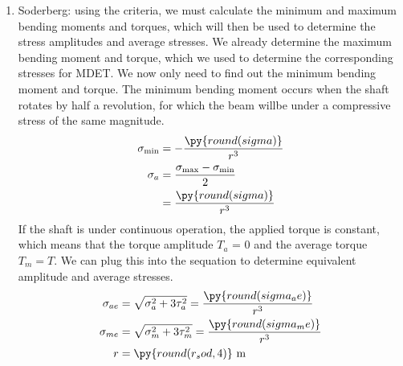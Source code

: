 \documentclass[
10pt,
a4paper,
openany,
svgnames,
]{book}
\begin{document}
\begin{solution}
\begin{enumerate}
    \item Soderberg: using the criteria, we must calculate the minimum and maximum bending moments and torques, which will then be used to determine the stress amplitudes and average stresses. We already determine the maximum bending moment and torque, which we used to determine the corresponding stresses for MDET. We now only need to find out the minimum bending moment and torque. The minimum bending moment occurs when the shaft rotates by half a revolution, for which the beam willbe under a compressive stress of the same magnitude.
      \begin{align*}
        \sigma_{\min} &= -\frac{\py{round(sigma)}}{r^{3}} \\
        \sigma_{a} &= \frac{\sigma_{\max} - \sigma_{\min}}{2} \\
                      &= \frac{\py{round(sigma)}}{r^{3}}
      \end{align*}
      If the shaft is under continuous operation, the applied torque is constant, which means that the torque amplitude $T_{a}$ = 0 and the average torque $T_{m} = T$. We can plug this into the sequation to determine equivalent amplitude and average stresses.
      \begin{align*}
        \sigma_{ae} &= \sqrt{ \sigma_{a}^{2} + 3 \tau_{a}^{2} } = \frac{\py{round(sigma_ae)}}{r^{3}} \\
        \sigma_{me} &= \sqrt{ \sigma_{m}^{2} + 3 \tau_{m}^{2}} = \frac{\py{round(sigma_me)}}{r^{3}} \\
        r &= \py{round(r_sod,4)} \text{ m}
      \end{align*}
  \end{enumerate}
\end{solution}
\end{document}
